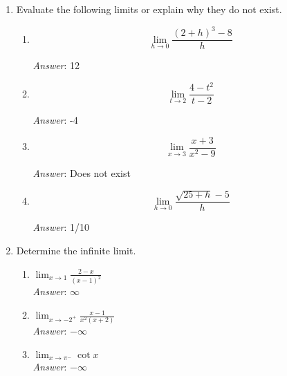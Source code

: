 \documentclass[11pt]{article}
\begin{document}
\begin{enumerate}
\begin{enumerate}
\end{enumerate}

\item Evaluate the following limits or explain why they do not exist.\\


\begin{enumerate}

\item \[\lim_{h\rightarrow 0}\frac{(2+h)^3-8}{h}\]

{\em Answer}: 12 \\

\item \[\lim_{t\rightarrow 2}\frac{4-t^2}{t-2}\]

{\em Answer}:  -4\\

\item \[\lim_{x\rightarrow 3}\frac{x+3}{x^2-9}\]

{\em Answer}: Does not exist \\

\item \[\lim_{h\rightarrow 0}\frac{\sqrt{25+h}-5}{h}\]

{\em Answer}: 1/10 \\

\end{enumerate}

\newpage


\item Determine the infinite limit.

\begin{enumerate}

\item $\lim_{x\rightarrow 1}\frac{2-x}{(x-1)^2}$\\


{\em Answer}:  $\infty$\\

\item $\lim_{x\rightarrow -2^+}\frac{x-1}{x^2(x+2)}$\\


{\em Answer}:  $-\infty$\\


\item $\lim_{x\rightarrow \pi^-}\cot x$\\

{\em Answer}: $-\infty$\\


\end{enumerate}
\end{enumerate}
\end{document}
